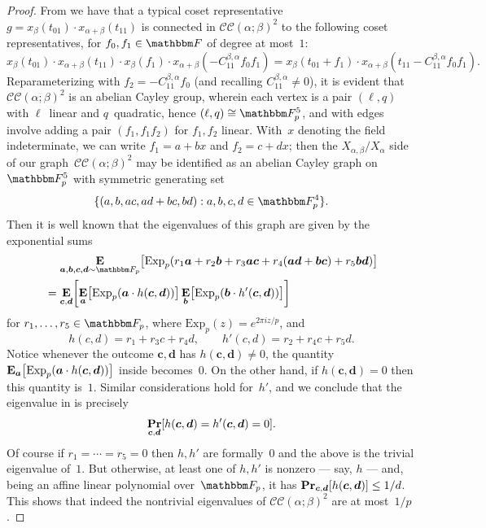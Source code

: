 \documentclass[10pt,a4paper]{article}
\theoremstyle{definition}
\renewcommand{\Pr}{\mathop{\bf Pr\/}}
\newcommand{\E}{\mathop{\bf E\/}}
\newcommand{\F}{\mathbbm F}
\newcommand{\ba}{\boldsymbol{a}}
\newcommand{\bb}{\boldsymbol{b}}
\newcommand{\bc}{\boldsymbol{c}}
\newcommand{\bd}{\boldsymbol{d}}
\DeclarePairedDelimiter\bracks{\lbrack}{\rbrack}
\newcommand{\CC}[2]{\mathcal{C}\mathcal{C}(#1;#2)}
\newcommand{\Exp}{{\mathrm{Exp}}}
\begin{document}
\begin{proof}
    From  we have that a typical coset representative 
    $
        g = x_\beta(t_{01})\cdot x_{\alpha+\beta}(t_{11})
    $
    is connected in $\CC{\alpha}{\beta}^2$ to the following coset representatives, for $f_0, f_1 \in \F$ of degree at most~$1$:
    \[
        x_\beta(t_{01})\cdot x_{\alpha+\beta}(t_{11})\cdot x_{\beta}(f_1) \cdot x_{\alpha+\beta}(-C_{11}^{\beta,\alpha} f_0f_1) = x_{\beta}(t_{01}+f_1) \cdot x_{\alpha+\beta}(t_{11} - C_{11}^{\beta,\alpha} f_0f_1).
    \]
    Reparameterizing with $f_2 = -C_{11}^{\beta,\alpha}f_0$ (and recalling $C_{11}^{\beta,\alpha} \neq 0$), it is evident that $\CC{\alpha}{\beta}^2$ is an abelian Cayley group, wherein each vertex is a pair $(\ell,q) $ with $\ell$~linear and $q$~quadratic, hence $(\ell,q) \cong \F_p^5$, and with edges involve adding a pair $(f_1,f_1f_2)$ for $f_1,f_2$ linear. With~$x$ denoting the field indeterminate, we can write $f_1 = a+bx$ and $f_2 = c + dx$; then the $X_{\alpha,\beta}/X_\alpha$ side of our graph~$\CC{\alpha}{\beta}^2$ may be identified as an abelian Cayley graph on~$\F_p^5$ with symmetric generating set 
    \[
        \{(a,b,ac,ad+bc,bd) : a,b,c,d \in \F_p^4\}.
    \]
    Then it is well known that the eigenvalues of this graph are given by the exponential sums
    \begin{align}
        &\mathrel{\phantom{=}} \E_{\ba,\bb,\bc,\bd \sim \F_p}\bracks*{\Exp_p(r_1\ba + r_2 \bb + r_3\ba\bc + r_4(\ba\bd+\bb\bc) + r_5\bb\bd)}  \nonumber \\
        &= \E_{\bc,\bd}\bracks*{
            \E_{\ba}\bracks*{\Exp_p(\ba \cdot h(\bc,\bd))}
            \E_{\bb}\bracks*{\Exp_p(\bb \cdot h'(\bc,\bd))}} \label{yo}
    \end{align}
    for $r_1, \dots, r_5 \in \F_p$, where $\Exp_p(z) = e^{2\pi i z/p}$, and
    \[
        h(c,d) = r_1 + r_3c + r_4d, \qquad h'(c,d) = r_2 + r_4c + r_5d.
    \]
    Notice whenever the outcome $\bc,\bd$ has $h(\bc,\bd) \neq 0$, the  quantity $\E_{\ba}\bracks*{\Exp_p(\ba \cdot h(\bc,\bd))}$ inside  becomes~$0$.  On the other hand, if $h(\bc,\bd) = 0$ then this quantity is~$1$.  Similar considerations hold for~$h'$, and we conclude that the eigenvalue in  is precisely
    \[
        \Pr_{\bc,\bd}\bracks*{h(\bc,\bd) = h'(\bc,\bd) = 0}.
    \]
    Of course if $r_1 = \cdots = r_5 = 0$ then $h,h'$ are formally~$0$ and the above is the trivial eigenvalue of~$1$. 
    But otherwise, at least one of $h,h'$ is nonzero --- say, $h$ --- and, being an  affine linear polynomial over~$\F_p$, it has $\Pr_{\bc,\bd}[h(\bc,\bd)] \leq 1/d$.  This shows that indeed the nontrivial eigenvalues of $\CC{\alpha}{\beta}^2$ are at most~$1/p$.


\end{proof}
\end{document}
